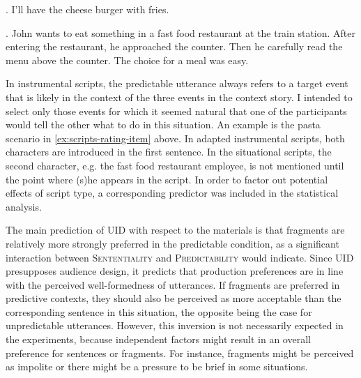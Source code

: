 \ex. I'll have the cheese burger with fries.
      
\ex. John wants to eat something in a fast food restaurant at the train station. After entering the restaurant, he approached the counter. Then he carefully read the menu above the counter. The choice for a meal was easy.

In instrumental scripts, the predictable utterance always refers to a target event that is likely in the context of the three events in the context story. I intended to select only those events for which it seemed natural that one of the participants would tell the other what to do in this situation. An example is the pasta scenario in \ref{ex:scripts-rating-item} above. In adapted instrumental scripts, both characters are introduced in the first sentence. In the situational scripts, the second character, e.g. the fast food restaurant employee, is not mentioned until the point where (s)he appears in the script. In order to factor out potential effects of script type, a corresponding predictor was included in the statistical analysis.

The main prediction of UID with respect to the materials is that fragments are relatively more strongly preferred in the predictable condition, as a significant interaction between \textsc{Sententiality} and \textsc{Predictability} would indicate. Since UID presupposes audience design, it predicts that production preferences are in line with the perceived well-formedness of utterances. If fragments are preferred in predictive contexts, they should also be perceived as more acceptable than the corresponding sentence in this situation, the opposite being the case for unpredictable utterances. However, this inversion is not necessarily expected in the experiments, because independent factors might result in an overall preference for sentences or fragments. For instance, fragments might be perceived as impolite or there might be a pressure to be brief in some situations.

